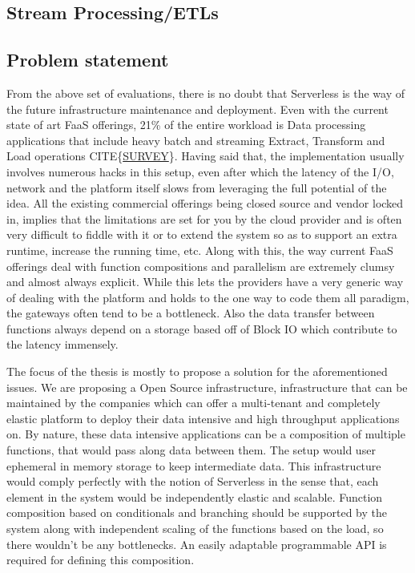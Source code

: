 \documentclass[12pt,titlepage]{article}
\begin{document}
\subsection{Stream Processing/ETLs}
\label{sec:org1bdc653}
\subsection{Problem statement}
\label{sec:orgdefcc73}
From the above set of evaluations, there is no doubt that Serverless is the way
of the future infrastructure maintenance and deployment. Even with the current
state of art FaaS offerings, 21\% of the entire workload is Data processing
applications that include heavy batch and streaming Extract, Transform and Load
operations CITE\{\href{https://www.serverless.com/blog/2018-serverless-community-survey-huge-growth-usage/}{SURVEY}\}. Having said that, the implementation usually involves
numerous hacks in this setup, even after which the latency of the I/O, network
and the platform itself slows from leveraging the full potential of the idea.
All the existing commercial offerings being closed source and vendor locked in,  
implies that the limitations are set for you by
the cloud provider and is often very difficult to fiddle with it or to extend
the system so as to support an extra runtime, increase the running time, etc.
Along with this, the way current FaaS offerings deal with function compositions
and parallelism are extremely clumsy and almost always explicit. While this lets
the providers have a very generic way of dealing with the platform and holds to
the one way to code them all paradigm, the gateways often tend to be a
bottleneck. Also the data transfer between functions always depend on a storage
based off of Block IO which contribute to the latency immensely.

The focus of the thesis is mostly to propose a solution for the aforementioned
issues. We are proposing a Open Source infrastructure, infrastructure that can
be maintained by the companies which can offer a multi-tenant and completely elastic
platform to deploy their data intensive and high throughput applications on.
By nature, these data intensive applications can be a composition of multiple
functions, that would pass along data between them. The setup would user
ephemeral in memory storage to keep intermediate data. This infrastructure
would comply perfectly with the notion of Serverless in the sense that, each
element in the system would be independently elastic and scalable. Function
composition based on conditionals and branching should be supported by the
system along with independent scaling of the functions based on the load, so
there wouldn't be any bottlenecks. An easily adaptable programmable API is
required for defining this composition.
\end{document}
